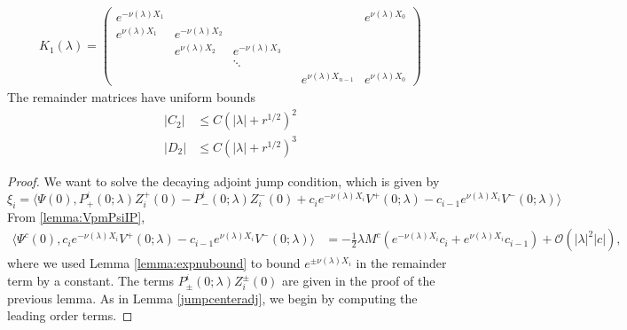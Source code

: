\documentclass[thesis.tex]{subfiles}
\begin{document}
\begin{lemma}
\begin{align*}
K_1(\lambda) =  
\begin{pmatrix}
e^{-\nu(\lambda)X_1} & & & & & e^{\nu(\lambda)X_0} \\
e^{\nu(\lambda)X_1} & e^{-\nu(\lambda)X_2} \\
& e^{\nu(\lambda)X_2} & e^{-\nu(\lambda)X_3} \\
 & & \ddots & &&   \\
& & & & e^{\nu(\lambda)X_{n-1}} & e^{\nu(\lambda)X_0}
\end{pmatrix}
\end{align*}
The remainder matrices have uniform bounds
\begin{align}\label{adjjumprem}
|C_2| &\leq C (|\lambda| + r^{1/2})^2 \\
|D_2| &\leq C (|\lambda| + r^{1/2})^3 
\end{align}

\begin{proof}
We want to solve the decaying adjoint jump condition, which is given by
\[
\xi_i = 
\langle \Psi(0), P^i_+(0; \lambda) Z_i^+(0) - P^i_-(0; \lambda) Z_i^-(0) + c_i e^{-\nu(\lambda)X_i}V^+(0; \lambda) - c_{i-1} e^{\nu(\lambda)X_i} V^-(0; \lambda) \rangle 
\]
From \cref{lemma:VpmPsiIP},
\begin{align}\label{PsiVpmjump}
\langle \Psi^c(0), c_i e^{-\nu(\lambda)X_i}V^+(0; \lambda) - c_{i-1} e^{\nu(\lambda)X_i} V^-(0; \lambda)  \rangle &= -\frac{1}{2}\lambda M^c\left( e^{-\nu(\lambda)X_i}c_i + e^{\nu(\lambda)X_i}c_{i-1}\right) + \mathcal{O}(|\lambda|^2 |c| ),
\end{align}
where we used Lemma \ref{lemma:expnubound} to bound $e^{\pm\nu(\lambda)X_i}$ in the remainder term by a constant. The terms $P^i_\pm(0; \lambda) Z_i^\pm(0)$ are given in the proof of the previous lemma. As in Lemma \ref{jumpcenteradj}, we begin by computing the leading order terms.


\end{proof}
\end{lemma}
\end{document}
